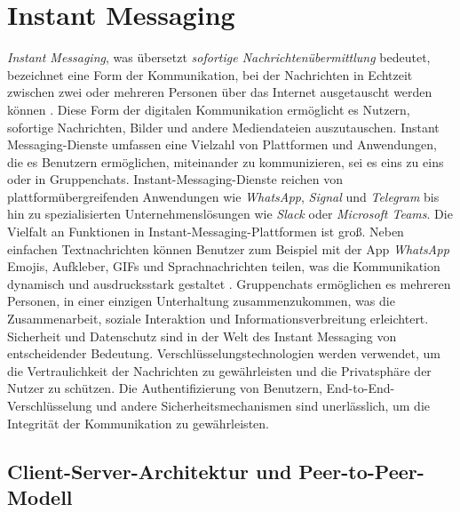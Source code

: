\section{Instant Messaging}


\textit{Instant Messaging}, was übersetzt \textit{sofortige Nachrichtenübermittlung} bedeutet, bezeichnet eine Form der Kommunikation, bei der Nachrichten in Echtzeit zwischen zwei oder mehreren Personen über das Internet ausgetauscht werden können \Parencite[S. 69]{nist_mobileDeviceForensics}. Diese Form der digitalen Kommunikation ermöglicht es Nutzern, sofortige Nachrichten, Bilder und andere Mediendateien auszutauschen. Instant Messaging-Dienste umfassen eine Vielzahl von Plattformen und Anwendungen, die es Benutzern ermöglichen, miteinander zu kommunizieren, sei es eins zu eins oder in Gruppenchats. Instant-Messaging-Dienste reichen von plattformübergreifenden Anwendungen wie \textit{WhatsApp}, \textit{Signal} und \textit{Telegram} bis hin zu spezialisierten Unternehmenslösungen wie \textit{Slack} oder \textit{Microsoft Teams}. Die Vielfalt an Funktionen in Instant-Messaging-Plattformen ist groß. Neben einfachen Textnachrichten können Benutzer zum Beispiel mit der App \textit{WhatsApp} Emojis, Aufkleber, GIFs und Sprachnachrichten teilen, was die Kommunikation dynamisch und ausdrucksstark gestaltet \Parencite{whatsapp_funktionen}. Gruppenchats ermöglichen es mehreren Personen, in einer einzigen Unterhaltung zusammenzukommen, was die Zusammenarbeit, soziale Interaktion und Informationsverbreitung erleichtert.
Sicherheit und Datenschutz sind in der Welt des Instant Messaging von entscheidender Bedeutung. Verschlüsselungstechnologien werden verwendet, um die Vertraulichkeit der Nachrichten zu gewährleisten und die Privatsphäre der Nutzer zu schützen. Die Authentifizierung von Benutzern, End-to-End-Verschlüsselung und andere Sicherheitsmechanismen sind unerlässlich, um die Integrität der Kommunikation zu gewährleisten.

\subsection{Client-Server-Architektur und Peer-to-Peer-Modell}

